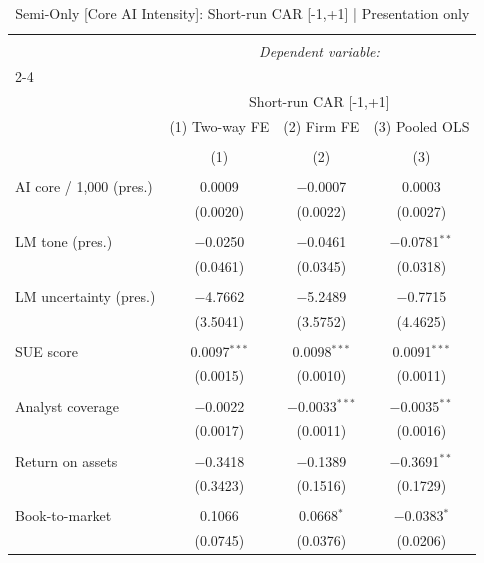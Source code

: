 
\begin{table}[!htbp] \centering 
  \caption{Semi-Only [Core AI Intensity]: Short-run CAR [-1,+1]  |  Presentation only} 
  \label{} 
\begin{tabular}{@{\extracolsep{5pt}}lccc} 
\\[-1.8ex]\hline 
\hline \\[-1.8ex] 
 & \multicolumn{3}{c}{\textit{Dependent variable:}} \\ 
\cline{2-4} 
\\[-1.8ex] & \multicolumn{3}{c}{Short-run CAR [-1,+1]} \\ 
 & (1) Two-way FE & (2) Firm FE & (3) Pooled OLS \\ 
\\[-1.8ex] & (1) & (2) & (3)\\ 
\hline \\[-1.8ex] 
 AI core / 1,000 (pres.) & 0.0009 & $-$0.0007 & 0.0003 \\ 
  & (0.0020) & (0.0022) & (0.0027) \\ 
  & & & \\ 
 LM tone (pres.) & $-$0.0250 & $-$0.0461 & $-$0.0781$^{**}$ \\ 
  & (0.0461) & (0.0345) & (0.0318) \\ 
  & & & \\ 
 LM uncertainty (pres.) & $-$4.7662 & $-$5.2489 & $-$0.7715 \\ 
  & (3.5041) & (3.5752) & (4.4625) \\ 
  & & & \\ 
 SUE score & 0.0097$^{***}$ & 0.0098$^{***}$ & 0.0091$^{***}$ \\ 
  & (0.0015) & (0.0010) & (0.0011) \\ 
  & & & \\ 
 Analyst coverage & $-$0.0022 & $-$0.0033$^{***}$ & $-$0.0035$^{**}$ \\ 
  & (0.0017) & (0.0011) & (0.0016) \\ 
  & & & \\ 
 Return on assets & $-$0.3418 & $-$0.1389 & $-$0.3691$^{**}$ \\ 
  & (0.3423) & (0.1516) & (0.1729) \\ 
  & & & \\ 
 Book-to-market & 0.1066 & 0.0668$^{*}$ & $-$0.0383$^{*}$ \\ 
  & (0.0745) & (0.0376) & (0.0206) \\ 

\end{tabular}
\end{table}
